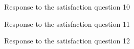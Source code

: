 \documentclass[12pt,oneside,openright,a4paper]{cpe-english-project}
\begin{document}
\begin{figure}[!h]\centering {} \caption{Response to the satisfaction question 10} \end{figure}
\begin{figure}[!h]\centering {} \caption{Response to the satisfaction question 11} \end{figure}
\begin{figure}[!h]\centering {} \caption{Response to the satisfaction question 12} \end{figure}
\end{document}
